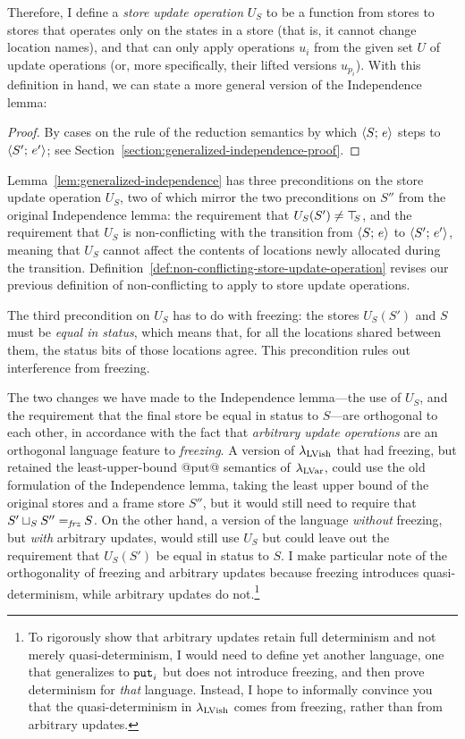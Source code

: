 Therefore, I define a \emph{store update operation} $U_S$ to be a
function from stores to stores that operates only on the states in a
store (that is, it cannot change location names), and that can only
apply operations $u_i$ from the given set $U$ of update operations
(or, more specifically, their lifted versions $u_{p_i}$).  With this
definition in hand, we can state a more general version of the
Independence lemma:

\LemGeneralizedIndependence
\begin{proof}
  By cases on the rule of the reduction semantics by which
  $\langle S;\, e \rangle$ steps to $\langle S';\, e' \rangle$; see
  Section~\ref{section:generalized-independence-proof}.
\end{proof}

Lemma~\ref{lem:generalized-independence} has three preconditions on
the store update operation $U_S$, two of which mirror the two
preconditions on $S''$ from the original Independence lemma: the
requirement that $U_S(S') \neq \top\hspace{-0.85mm}_{S}$, and the requirement that $U_S$
is non-conflicting with the transition from $\langle S;\, e \rangle$ to
$\langle S';\, e' \rangle$, meaning that $U_S$ cannot affect the contents of
locations newly allocated during the transition.
Definition~\ref{def:non-conflicting-store-update-operation} revises
our previous definition of non-conflicting to apply to store update
operations.

\DefNonConflictingStoreUpdateOperation

The third precondition on $U_S$ has to do with freezing: the stores
$U_S(S')$ and $S$ must be \emph{equal in status}, which means that,
for all the locations shared between them, the status bits of those
locations agree.  This precondition rules out interference from
freezing.

\DefEqualStatus

The two changes we have made to the Independence lemma---the use of
$U_S$, and the requirement that the final store be equal in status to
$S$---are orthogonal to each other, in accordance with the fact that
\emph{arbitrary update operations} are an orthogonal language feature
to \emph{freezing}.  A version of $\lambda_{\textrm{LVish}}$ that had freezing,
but retained the least-upper-bound @put@ semantics of $\lambda_{\textrm{LVar}}$,
could use the old formulation of the Independence lemma, taking the
least upper bound of the original stores and a frame store $S''$, but
it would still need to require that $S' \sqcup_{S} S'' =_{\textit{frz}} S$.
On the other hand, a version of the language \emph{without} freezing,
but \emph{with} arbitrary updates, would still use $U_S$ but could
leave out the requirement that $U_S(S')$ be equal in status to $S$.  I
make particular note of the orthogonality of freezing and arbitrary
updates because freezing introduces quasi-determinism, while arbitrary
updates do not.\footnote{To rigorously show that arbitrary updates
  retain full determinism and not merely quasi-determinism, I would
  need to define yet another language, one that generalizes 
  to $\mbox{\texttt{put}}_i$ but does not introduce freezing, and then prove
  determinism for \emph{that} language.  Instead, I hope to informally
  convince you that the quasi-determinism in $\lambda_{\textrm{LVish}}$ comes from
  freezing, rather than from arbitrary updates.}

